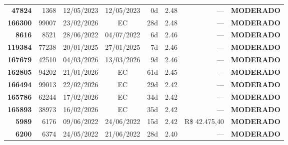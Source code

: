 \documentclass[a4paper,10pt]{article}
\begin{document}
\begin{center}
\begin{longtable}{>{\scriptsize}r>{\scriptsize}r>{\scriptsize}c>{\scriptsize}c>{\scriptsize}r>{\scriptsize}r>{\scriptsize}r>{\scriptsize}l}
\textcolor{anomyellow}{\textbf{47824}} & 1368 & 12/05/2023 & 12/05/2023 & 0d & \textcolor{anomyellow}{2.48} & --- & \textcolor{anomyellow}{\textbf{MODERADO}} \\

\textcolor{anomyellow}{\textbf{166300}} & 99007 & 23/02/2026 & \textcolor{anomorange}{EC} & 28d & \textcolor{anomyellow}{2.48} & --- & \textcolor{anomyellow}{\textbf{MODERADO}} \\

\textcolor{anomyellow}{\textbf{8616}} & 8521 & 28/06/2022 & 04/07/2022 & 6d & \textcolor{anomyellow}{2.46} & --- & \textcolor{anomyellow}{\textbf{MODERADO}} \\

\textcolor{anomyellow}{\textbf{119384}} & 77238 & 20/01/2025 & 27/01/2025 & 7d & \textcolor{anomyellow}{2.46} & --- & \textcolor{anomyellow}{\textbf{MODERADO}} \\

\textcolor{anomyellow}{\textbf{167679}} & 42510 & 04/03/2026 & 13/03/2026 & 9d & \textcolor{anomyellow}{2.46} & --- & \textcolor{anomyellow}{\textbf{MODERADO}} \\

\textcolor{anomyellow}{\textbf{162805}} & 94202 & 21/01/2026 & \textcolor{anomorange}{EC} & 61d & \textcolor{anomyellow}{2.45} & --- & \textcolor{anomyellow}{\textbf{MODERADO}} \\

\textcolor{anomyellow}{\textbf{166494}} & 99013 & 22/02/2026 & \textcolor{anomorange}{EC} & 29d & \textcolor{anomyellow}{2.42} & --- & \textcolor{anomyellow}{\textbf{MODERADO}} \\

\textcolor{anomyellow}{\textbf{165786}} & 62244 & 17/02/2026 & \textcolor{anomorange}{EC} & 34d & \textcolor{anomyellow}{2.42} & --- & \textcolor{anomyellow}{\textbf{MODERADO}} \\

\textcolor{anomyellow}{\textbf{165893}} & 38973 & 16/02/2026 & \textcolor{anomorange}{EC} & 35d & \textcolor{anomyellow}{2.42} & --- & \textcolor{anomyellow}{\textbf{MODERADO}} \\

\textcolor{anomyellow}{\textbf{5989}} & 6176 & 09/06/2022 & 24/06/2022 & 15d & \textcolor{anomyellow}{2.42} & R\$ 42.475,40 & \textcolor{anomyellow}{\textbf{MODERADO}} \\

\textcolor{anomyellow}{\textbf{6200}} & 6374 & 24/05/2022 & 21/06/2022 & 28d & \textcolor{anomyellow}{2.40} & --- & \textcolor{anomyellow}{\textbf{MODERADO}} \\


\end{longtable}
\end{center}
\end{document}
